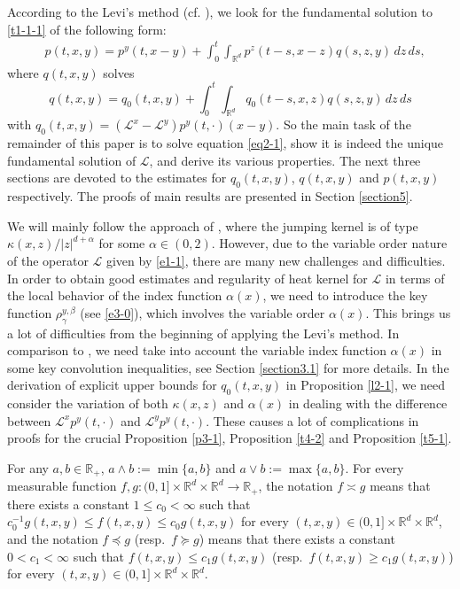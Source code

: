 \documentclass[a4paper,11pt]{amsart}
\renewcommand{\le}{\leqslant}
\renewcommand{\ge}{\geqslant}
\newcommand{\R}{\mathds R}
\newcommand{\B}{\beta}
\newcommand{\p}{\preceq}
\newcommand{\q}{\succeq}
\newcommand{\A}{\alpha}
\newcommand{\G}{\gamma}
\def\LL{{\mathcal L}}
\theoremstyle{definition}
\begin{document}
According to the Levi's method (cf. \cite[pp.\ 310--311]{Fi}), we
look for the fundamental solution to \eqref{t1-1-1} of the following
form:
\begin{equation}\label{eq2-1}
\begin{split}
& p(t,x,y)=p^y(t,x-y)+\int_0^t\int_{\R^d}p^z(t-s,x-z)q(s,z,y)\,dz\,ds,
\end{split}
\end{equation}
where $q(t,x,y)$ solves
\begin{equation}\label{eq2-2}
q(t,x,y)=q_0(t,x,y)+\int_0^t\int_{\R^d}q_0(t-s,x,z)q(s,z,y)\,dz\,ds
\end{equation}
with
$
q_0(t,x,y)=( \LL^x- \LL^y)p^y(t,\cdot)(x-y).
$
So the main task of the remainder of this paper is to solve equation \eqref{eq2-1},
show it is  indeed  the unique fundamental solution of $\LL$, and derive its various properties.
The next three sections are devoted to the estimates for $q_0(t,x,y)$, $q(t,x,y)$ and $p(t,x,y)$ respectively. The proofs of main results are presented in Section \ref{section5}.


We will mainly follow the approach of \cite{CZ}, where the jumping
kernel is of type $\kappa(x,z)/|z|^{d+\alpha}$ for some $\alpha\in (0,2)$.
However, due to the variable order nature of the operator $\LL$ given
by \eqref{e1-1}, there are many
new challenges and difficulties.
In order to obtain
good estimates
and regularity of heat
kernel for $\LL$
in terms of the local behavior of the index function $\alpha (x)$,
we need to  introduce the key function $\rho_{\G}^{y,\B}$
(see \eqref{e3-0}), which involves the variable order $\A (x)$.
This brings us a lot of
difficulties  from the beginning of applying the Levi's method.
In comparison to \cite[Section 2.1]{CZ}, we need take into account
the variable index function $\alpha(x)$ in
some key
convolution
inequalities, see Section \ref{section3.1} for more details.
In the derivation of explicit upper bounds for $q_0(t,x,y)$ in  Proposition
\ref{l2-1}, we need consider the variation of both $\kappa(x,z)$
and $\alpha(x)$ in dealing with the difference between
$ \LL^xp^y(t,\cdot)$ and $ \LL^yp^y(t,\cdot)$. These causes a lot of complications
in proofs for  the crucial Proposition \ref{p3-1}, Proposition \ref{t4-2}
and Proposition \ref{t5-1}.

\medskip

\quad For any $a,b\in \R_+$, $a\wedge b:=\min\{a,b\}$ and $a\vee b:=\max \{a,b\}.$ For every measurable function $f,g:(0,1]\times\R^d\times \R^d \rightarrow \R_+$, the notation $f \asymp g$ means that there exists a
constant $1\le c_0<\infty$ such that $c_0^{-1} g(t,x,y)\le f(t,x,y)\le c_0 g(t,x,y)$ for every $(t,x,y) \in (0,1]\times\R^d\times \R^d $,  and the notation $f \p g$ (resp.\ $f \q g$)  means that there exists a
constant $0<c_1<\infty$ such that $f(t,x,y)\le c_1 g(t,x,y)$ (resp.\ $f(t,x,y)\ge c_1g(t,x,y)$) for every $(t,x,y) \in (0,1]\times\R^d\times \R^d $.
\end{document}
